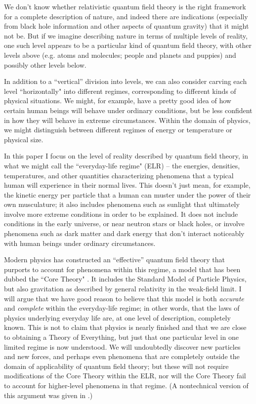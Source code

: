\documentclass[12pt,letterpaper]{article}
\begin{document}
We don't know whether relativistic quantum field theory is the right framework for a complete description of nature, and indeed there are indications (especially from black hole information and other aspects of quantum gravity) that it might not be.
But if we imagine describing nature in terms of multiple levels of reality, one such level appears to be a particular kind of quantum field theory, with other levels above (e.g. atoms and molecules; people and planets and puppies) and possibly other levels below.

In addition to a ``vertical'' division into levels, we can also consider carving each level ``horizontally" into different regimes, corresponding to different kinds of physical situations.
We might, for example, have a pretty good idea of how certain human beings will behave under ordinary conditions, but be less confident in how they will behave in extreme circumstances.
Within the domain of physics, we might distinguish between different regimes of energy or temperature or physical size.

In this paper I focus on the level of reality described by quantum field theory, in what we might call the ``everyday-life regime" (ELR) -- the energies, densities, temperatures, and other quantities characterizing phenomena that a typical human will experience in their normal lives.
This doesn't just mean, for example, the kinetic energy per particle that a human can muster under the power of their own musculature; it also includes phenomena such as sunlight that ultimately involve more extreme conditions in order to be explained.
It does not include conditions in the early universe, or near neutron stars or black holes, or involve phenomena such as dark matter and dark energy that don't interact noticeably with human beings under ordinary circumstances.

Modern physics has constructed an ``effective'' quantum field theory that purports to account for phenomena within this regime, a model that has been dubbed the ``Core Theory" \citep{wilczek2015beautiful}.
It includes the Standard Model of Particle Physics, but also gravitation as described by general relativity in the weak-field limit.
I will argue that we have good reason to believe that this model is both \emph{accurate} and \emph{complete} within the everyday-life regime; in other words, that the laws of physics underlying everyday life are, at one level of description, completely known.
This is not to claim that physics is nearly finished and that we are close to obtaining a Theory of Everything, but just that one particular level in one limited regime is now understood.
We will undoubtedly discover new particles and new forces, and perhaps even phenomena that are completely outside the domain of applicability of quantum field theory; but these will not require modifications of the Core Theory within the ELR, nor will the Core Theory fail to account for higher-level phenomena in that regime.
(A nontechnical version of this argument was given in \citep{carroll2017big}.)
\end{document}
